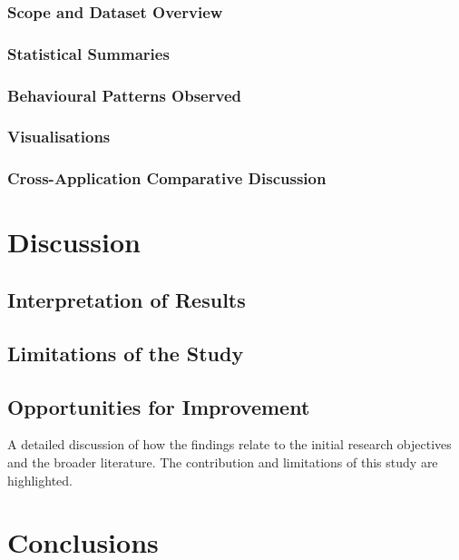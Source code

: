 \documentclass[a4paper,12pt]{report}
\begin{document}
\subsection{Scope and Dataset Overview}
\subsection{Statistical Summaries}
\subsection{Behavioural Patterns Observed}
\subsection{Visualisations}
\subsection{Cross-Application Comparative Discussion}

\chapter{Discussion}

\section{Interpretation of Results}

\section{Limitations of the Study}

\section{Opportunities for Improvement}


A detailed discussion of how the findings relate to the initial research objectives and the broader literature. The contribution and limitations of this study are highlighted.

\chapter{Conclusions}
\end{document}
